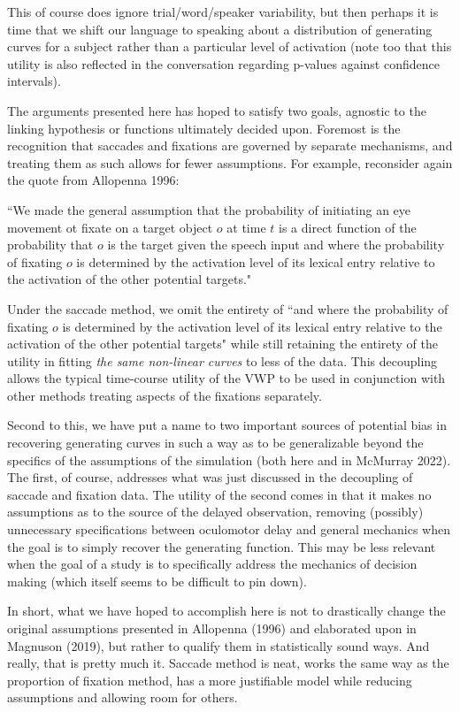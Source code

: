 This of course does ignore trial/word/speaker variability, but then perhaps it is time that we shift our language to speaking about a distribution of generating curves for a subject rather than a particular level of activation (note too that this utility is also reflected in the conversation regarding p-values against confidence intervals). 

The arguments presented here has hoped to satisfy two goals, agnostic to the linking hypothesis or functions ultimately decided upon. Foremost is the recognition that saccades and fixations are governed by separate mechanisms, and treating them as such allows for fewer assumptions. For example, reconsider again the quote from Allopenna 1996:

 ``We made the general assumption that the probability of initiating an eye movement ot fixate on a target object $o$ at time $t$ is a direct function of the probability that $o$ is the target given the speech input and where the probability of fixating $o$ is determined by the activation level of its lexical entry relative to the activation of the other potential targets."
 
Under the saccade method, we omit the entirety of ``and where the probability of fixating $o$ is determined by the activation level of its lexical entry relative to the activation of the other potential targets" while still retaining the entirety of the utility in fitting \textit{the same non-linear curves} to less of the data. This decoupling allows the typical time-course utility of the VWP to be used in conjunction with other  methods treating aspects of the fixations separately.

Second to this, we have put a name to two important sources of potential bias in recovering generating curves in such a way as to be generalizable beyond the specifics of the assumptions of the simulation (both here and in McMurray 2022). The first, of course, addresses what was just discussed in the decoupling of saccade and fixation data. The utility of the second comes in that it makes no assumptions as to the source of the delayed observation, removing (possibly) unnecessary specifications between oculomotor delay and general mechanics when the goal is to simply recover the generating function. This may be less relevant when the goal of a study is to specifically address the mechanics of decision making (which itself seems to be difficult to pin down).

In short, what we have hoped to accomplish here is not to drastically change the original assumptions presented in Allopenna (1996) and elaborated upon in Magnuson (2019), but rather to qualify them in statistically sound ways. And really, that is pretty much it. Saccade method is neat, works the same way as the proportion of fixation method, has a more justifiable model while reducing assumptions and allowing room for others.


